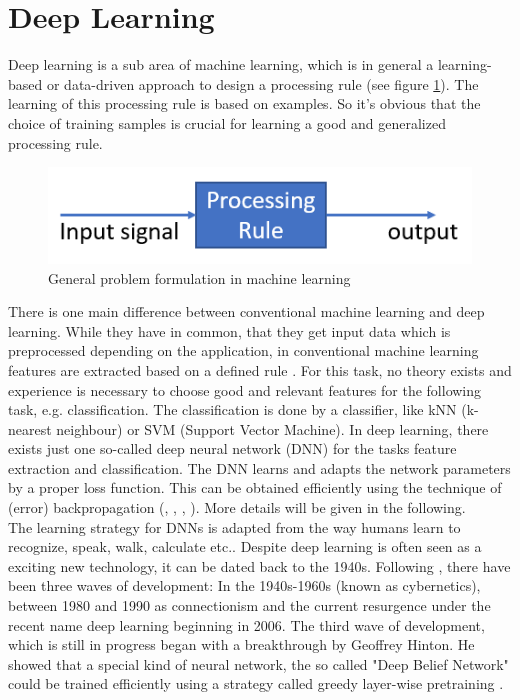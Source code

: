\documentclass[12pt,DIV14,BCOR12mm,a4paper,footexclude,headinclude,halfparskip-,twoside,openright,cleardoubleempty,idxtotoc,bibtotoc,listtotoc,abstracton]{scrreprt} %
\numberwithin{equation}{chapter}
\begin{document}
\section{Deep Learning}
Deep learning is a sub area of machine learning, which is in general a learning-based or data-driven approach to design a processing rule (see figure \ref{fig:ProcessingRule}). The learning of this processing rule is based on examples. So it's obvious that the choice of training samples is crucial for learning a good and generalized processing rule. 
\begin{figure}[htb!]
	\centering
	\includegraphics[width=0.5\linewidth]{Graphiken/ProcessingRule}
	\caption{General problem formulation in machine learning}
	\label{fig:ProcessingRule}
\end{figure}
There is one main difference between conventional machine learning and deep learning. While they have in common, that they get input data which is preprocessed depending on the application, in conventional machine learning features are extracted based on a defined rule \cite{Goodfellow-et-al-2016}. For this task, no theory exists and experience is necessary to choose good and relevant features for the following task, e.g. classification. The classification is done by a classifier, like kNN (k-nearest neighbour) or SVM (Support Vector Machine). In deep learning, there exists just one so-called deep neural network (DNN) for the tasks feature extraction and classification. The DNN learns and adapts the network parameters by a proper loss function. This can be obtained efficiently using the technique of (error) backpropagation (\cite{Goodfellow-et-al-2016}, \cite{Nielsen-Michael}, \cite{DeepLearningDive}, \cite{Bishop}). More details will be given in the following.\\
The learning strategy for DNNs is adapted from the way humans learn to recognize, speak, walk, calculate etc.. Despite deep learning is often seen as a exciting new technology, it can be dated back to the 1940s. Following \cite{Goodfellow-et-al-2016}, there have been three waves of development: In the 1940s-1960s (known as cybernetics), between 1980 and 1990 as connectionism and the current resurgence under the recent name deep learning beginning in 2006. The third wave of development, which is still in progress began with a breakthrough by Geoffrey Hinton. He showed that a special kind of neural network, the so called "Deep Belief Network" could be trained efficiently using a strategy called greedy layer-wise pretraining \cite{Hinton-et-al-2006}.\\
\end{document}
